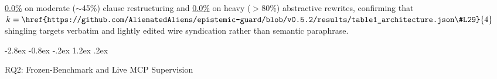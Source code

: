 \documentclass[10pt,twocolumn]{article}
\makeatletter
\renewcommand\subsection{\@startsection{subsection}{2}{\z@}%
  {-2.8ex \@plus -0.8ex \@minus -.2ex}%
  {1.2ex \@plus .2ex}%
  {\normalfont\large\bfseries\raggedright}}
\makeatother
\begin{document}
\begin{itemize}
\href{https://github.com/AlienatedAliens/epistemic-guard/blob/v0.5.2/results/table2_conformance.json\#L78}{0.0\%} on moderate ($\sim$45\%) clause restructuring and \href{https://github.com/AlienatedAliens/epistemic-guard/blob/v0.5.2/results/table2_conformance.json\#L79}{0.0\%} on heavy ($>$80\%) abstractive rewrites, confirming that $k=\href{https://github.com/AlienatedAliens/epistemic-guard/blob/v0.5.2/results/table1_architecture.json\#L29}{4}$ shingling targets verbatim and lightly edited wire syndication rather than semantic paraphrase.
\end{itemize}

\subsection{RQ2: Frozen-Benchmark and Live MCP Supervision}
\label{sec:rq2}
\end{document}
